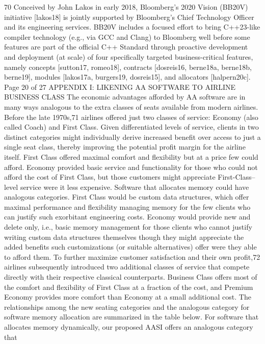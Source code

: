 70 Conceived by John Lakos in early 2018, Bloomberg’s 2020 Vision (BB20V) initiative [lakos18] is
jointly supported by Bloomberg’s Chief Technology Officer and its engineering services. BB20V
includes a focused effort to bring C++23-like compiler technology (e.g., via GCC and Clang) to
Bloomberg well before some features are part of the official C++ Standard through proactive
development and deployment (at scale) of four specifically targeted business-critical features, namely
concepts [sutton17, romeo18], contracts [dosreis16, berne18a, berne18b, berne19], modules
[lakos17a, burgers19, dosreis15], and allocators [halpern20c].
Page 20 of 27
APPENDIX I: LIKENING AA SOFTWARE TO AIRLINE BUSINESS CLASS
The economic advantages afforded by AA software are in many ways analogous to
the extra classes of seats available from modern airlines. Before the late 1970s,71
airlines offered just two classes of service: Economy (also called Coach) and First
Class. Given differentiated levels of service, clients in two distinct categories might
individually derive increased benefit over access to just a single seat class, thereby
improving the potential profit margin for the airline itself. First Class offered
maximal comfort and flexibility but at a price few could afford. Economy provided
basic service and functionality for those who could not afford the cost of First Class,
but those customers might appreciate First-Class–level service were it less
expensive.
Software that allocates memory could have analogous categories. First Class would
be custom data structures, which offer maximal performance and flexibility
managing memory for the few clients who can justify such exorbitant engineering
costs. Economy would provide new and delete only, i.e., basic memory
management for those clients who cannot justify writing custom data structures
themselves though they might appreciate the added benefits such customizations (or
suitable alternatives) offer were they able to afford them.
To further maximize customer satisfaction and their own profit,72 airlines
subsequently introduced two additional classes of service that compete directly with
their respective classical counterparts. Business Class offers most of the comfort
and flexibility of First Class at a fraction of the cost, and Premium Economy
provides more comfort than Economy at a small additional cost.
The relationships among the new seating categories and the analogous category for
software memory allocation are summarized in the table below. For software that
allocates memory dynamically, our proposed AASI offers an analogous category that
